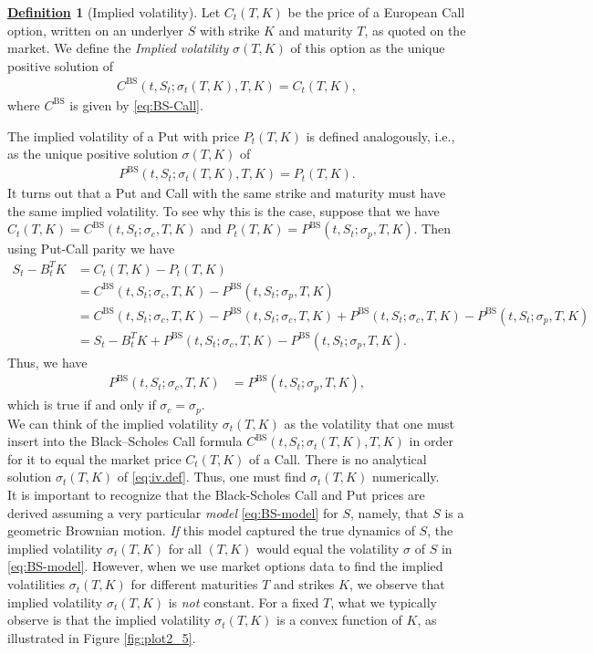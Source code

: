 \documentclass[12pt]{book}
\numberwithin{equation}{chapter}
\theoremstyle{plain}
\numberwithin{theorem}{section}
\theoremstyle{definition}
\newtheorem{definition}[theorem]{\underline{Definition}}
\numberwithin{exercise}{chapter}
\newcommand{\<}{\langle}
\renewcommand{\>}{\rangle}
\renewcommand{\(}{\left(}
\renewcommand{\)}{\right)}
\renewcommand{\[}{\left[}
\renewcommand{\]}{\right]}
\newcommand\sig{\sigma}
\newcommand\BS{\textrm{BS}}
\theoremstyle{definition}
\numberwithin{question}{section}
\begin{document}
\begin{definition}[Implied volatility]
Let $C_t(T,K)$ be the price of a European Call option, written on an underlyer $S$ with strike $K$ and maturity $T$, as quoted on the market.  We define the \textit{Implied volatility} $\sigma(T,K)$ of this option as the unique positive solution of
\begin{align}
		C^\BS(t,S_t;\sig_t(T,K),T, K) = C_t(T,K) , \label{eq:iv.def}
\end{align}
where $C^\BS$ is given by \eqref{eq:BS-Call}.  
\end{definition}
\noindent
The implied volatility of a Put with price $P_t(T,K)$ is defined analogously, i.e., as the unique positive solution $\sig(T,K)$ of
\begin{align}
		P^\BS(t,S_t;\sig_t(T,K),T, K) = P_t(T,K) .
\end{align}
It turns out that a Put and Call with the same strike and maturity must have the same implied volatility.  To see why this is the case, suppose that we have $C_t(T,K) = C^\BS(t,S_t;\sig_c,T,K)$ and $P_t(T,K) = P^\BS(t,S_t;\sig_p,T,K)$.  Then using Put-Call parity we have
\begin{align}
S_t - B_t^T K
	&=	C_t(T,K) - P_t(T,K) \\
	&=	C^\BS(t,S_t;\sig_c,T,K) - P^\BS(t,S_t;\sig_p,T,K) \\
	&=	C^\BS(t,S_t;\sig_c,T,K) - P^\BS(t,S_t;\sig_c,T,K) + P^\BS(t,S_t;\sig_c,T,K) - P^\BS(t,S_t;\sig_p,T,K) \\
	&=	S_t - B_t^T K + P^\BS(t,S_t;\sig_c,T,K) - P^\BS(t,S_t;\sig_p,T,K) .
\end{align}
Thus, we have  
\begin{align}
P^\BS(t,S_t;\sig_c,T,K) 
	&= P^\BS(t,S_t;\sig_p,T,K) ,
\end{align}
which is true if and only if $\sig_c = \sig_p$.
\\[0.5em]
We can think of the implied volatility $\sig_t(T,K)$ as the volatility that one must insert into the Black--Scholes Call formula $C^\BS(t,S_t;\sig_t(T,K),T, K)$ in order for it to equal the market price $C_t(T,K)$ of a Call.  
There is no analytical solution $\sig_t(T,K)$ of \eqref{eq:iv.def}.  Thus, one must find $\sig_t(T,K)$ numerically.  
\\[0.5em]
It is important to recognize that the Black-Scholes Call and Put prices are derived assuming a very particular \textit{model} \eqref{eq:BS-model} for $S$, namely, that $S$ is a geometric Brownian motion. \textit{If} this model captured the true dynamics of $S$, the implied volatility $\sig_t(T,K)$ for all $(T,K)$ would equal the volatility $\sig$ of $S$ in \eqref{eq:BS-model}.  However, when we use market options data to find the implied volatilities $\sig_t(T,K)$ for different maturities $T$ and strikes $K$, we observe that implied volatility $\sig_t(T,K)$ is \textit{not} constant.  For a fixed $T$, what we typically observe is that the implied volatility $\sig_t(T,K)$ is a convex function of $K$,  as illustrated in Figure \ref{fig:plot2_5}.
\end{document}
